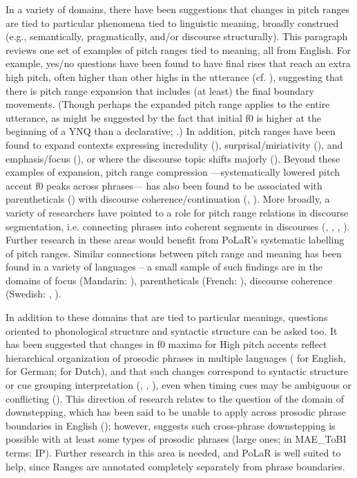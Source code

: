 \documentclass[11pt, twoside]{memoir}
\begin{document}
In a variety of domains, there have been suggestions that changes in pitch ranges are tied to particular phenomena tied to linguistic meaning, broadly construed (e.g., semantically, pragmatically, and/or discourse structurally). This paragraph reviews one set of examples of pitch ranges tied to meaning, all from English. For example, yes/no questions have been found to have final rises that reach an extra high pitch, often higher than other highs in the utterance (cf. \citealt{pierrehumbert80}), suggesting that there is pitch range expansion that includes (at least) the final boundary movements. (Though perhaps the expanded pitch range applies to the entire utterance, as might be  suggested by the fact that initial f0 is higher at the beginning of a YNQ than a declarative; \citealt{sicoli-15}.) In addition, pitch ranges have been found to expand contexts expressing incredulity (\citealt{hirschbergward92}), surprisal\slash miriativity (\citealt{rett-20}), and emphasis\slash focus (\citealt{xuxu05}), or where the discourse topic shifts majorly (\citealt{hirschbergpierrehumbert86}). Beyond these examples of expansion, pitch range compression —systematically lowered pitch accent f0 peaks across phrases— has also been found to be associated with parentheticals (\citealt{price-91, dehe09}) with discourse coherence\slash continuation (\citealt{beckman93}, \citealt{bruce-97}). More broadly, a variety of researchers have pointed to a role for pitch range relations in discourse segmentation, i.e. connecting phrases into coherent segments in discourses (\citealt{hirst93a}, \citealt{wichmann00}, \citealt{hirschberg04}, \citealt{lin-11}). Further research in these areas would benefit from PoLaR’s systematic labelling of pitch ranges.  Similar connections between pitch range and meaning has been found in a variety of languages – a small sample of such findings are in the domains of focus (Mandarin: \citealt{xu99}), parentheticals (French: \citealt{fagyal02}), discourse coherence (Swedish: \citealt{hansson03}, \citealt{carlson-05}).

In addition to these domains that are tied to particular meanings, questions oriented to phonological structure and syntactic structure can be asked too. It has been suggested that changes in f0 maxima for High pitch accents reflect hierarchical organization of prosodic phrases in multiple languages (\citealt{ladd88} for English, \citealt{fery-05} for German; \citealt{berg-92} for Dutch), and that such changes correspond to syntactic structure or cue grouping interpretation (\citealt{ladd88, ladd92}, \citealt{fery-05}, \citealt{kentnerfery13}), even when timing cues may be ambiguous or conflicting (\citealt{brugos15}). This direction of research relates to the question of the domain of downstepping, which has been said to be unable to apply across prosodic phrase boundaries in English (\citealt{beckmanayers97}); however, \citealt{sturman19} suggests such cross-phrase downstepping is possible with at least some types of prosodic phrases (large ones; in MAE\_ToBI terms: IP). Further research in this area is needed, and PoLaR is well suited to help, since Ranges are annotated completely separately from phrase boundaries.
\end{document}
